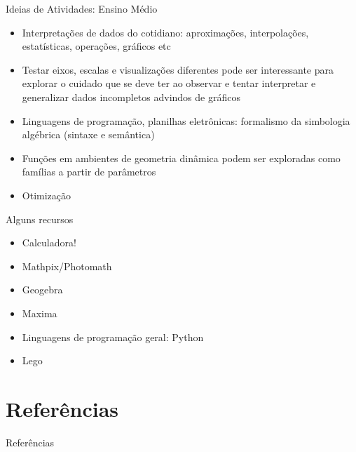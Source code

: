 \documentclass[10pt,]{beamer}
\begin{document}
\begin{frame}{Ideias de Atividades: Ensino Médio}
  \begin{itemize}
  \item Interpretações de dados do cotidiano: aproximações, interpolações, estatísticas, operações, gráficos etc
  \item Testar eixos, escalas e visualizações diferentes pode ser interessante para explorar o cuidado que se deve ter ao observar e tentar interpretar e generalizar dados incompletos advindos de gráficos
  \item Linguagens de programação, planilhas eletrônicas: formalismo da simbologia algébrica (sintaxe e semântica)
  \item Funções em ambientes de geometria dinâmica podem ser exploradas como famílias a partir de parâmetros
  \item Otimização
  \end{itemize}
\end{frame}

\begin{frame}{Alguns recursos}
  \begin{itemize}
  \item Calculadora!
  \item Mathpix/Photomath
  \item Geogebra
  \item Maxima
  \item Linguagens de programação geral: Python
  \item Lego
  \end{itemize}
\end{frame}

\section{Referências}
\begin{frame}{Referências}
  
  
\end{frame}
\end{document}
